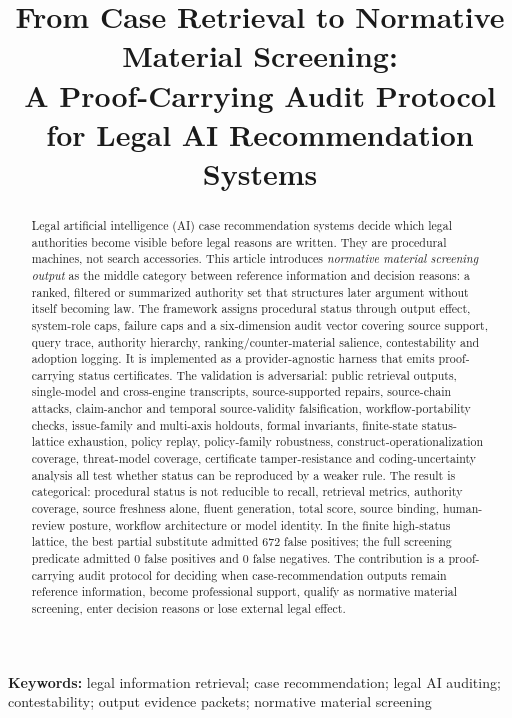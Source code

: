 \documentclass[12pt,a4paper]{article}
\title{From Case Retrieval to Normative Material Screening:\\
A Proof-Carrying Audit Protocol for Legal AI Recommendation Systems}
\author{}
\date{}
\begin{document}
\maketitle

\begin{abstract}
Legal artificial intelligence (AI) case recommendation systems decide which legal authorities become visible before legal reasons are written. They are procedural machines, not search accessories. This article introduces \textit{normative material screening output} as the middle category between reference information and decision reasons: a ranked, filtered or summarized authority set that structures later argument without itself becoming law. The framework assigns procedural status through output effect, system-role caps, failure caps and a six-dimension audit vector covering source support, query trace, authority hierarchy, ranking/counter-material salience, contestability and adoption logging. It is implemented as a provider-agnostic harness that emits proof-carrying status certificates. The validation is adversarial: public retrieval outputs, single-model and cross-engine transcripts, source-supported repairs, source-chain attacks, claim-anchor and temporal source-validity falsification, workflow-portability checks, issue-family and multi-axis holdouts, formal invariants, finite-state status-lattice exhaustion, policy replay, policy-family robustness, construct-operationalization coverage, threat-model coverage, certificate tamper-resistance and coding-uncertainty analysis all test whether status can be reproduced by a weaker rule. The result is categorical: procedural status is not reducible to recall, retrieval metrics, authority coverage, source freshness alone, fluent generation, total score, source binding, human-review posture, workflow architecture or model identity. In the finite high-status lattice, the best partial substitute admitted 672 false positives; the full screening predicate admitted 0 false positives and 0 false negatives. The contribution is a proof-carrying audit protocol for deciding when case-recommendation outputs remain reference information, become professional support, qualify as normative material screening, enter decision reasons or lose external legal effect.
\end{abstract}

\noindent\textbf{Keywords:} legal information retrieval; case recommendation; legal AI auditing; contestability; output evidence packets; normative material screening
\end{document}

